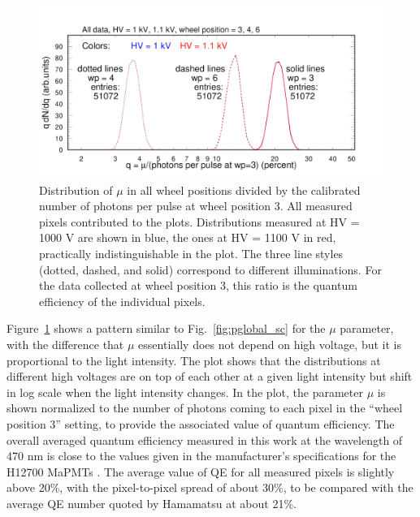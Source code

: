 \begin{figure}[h!]
	\centering
	\includegraphics[width=0.98\linewidth,trim=0 12 50 35,clip]{figures/pglobal_qe_all.pdf}
	\caption{Distribution of $\mu$ in all wheel positions divided by the calibrated number of photons per pulse at wheel position 3. All measured pixels contributed to the plots. Distributions measured at HV = 1000 V are shown in blue, the ones at HV = 1100 V in red, practically indistinguishable in the plot. The three line styles (dotted, dashed, and solid) correspond to different illuminations. For the data collected at wheel position 3, this ratio is the quantum efficiency of the individual pixels.}
	\label{fig:pglobal_qe_all}
\end{figure}
Figure~\ref{fig:pglobal_qe_all} shows a pattern similar to Fig.~\ref{fig:pglobal_sc} for the $\mu$ parameter, with the difference that $\mu$ essentially does not depend on high voltage, but it is proportional to the light intensity. The plot shows that the distributions at different high voltages are on top of each other at a given light intensity but shift in log scale when the light intensity changes. In the plot, the parameter $\mu$ is shown normalized to the number of photons coming to each pixel in the ``wheel position 3'' setting, to provide the associated value of quantum efficiency. The overall averaged quantum efficiency measured in this work at the wavelength of 470 nm is close to the values given in the manufacturer's specifications for the H12700 MaPMTs \cite{H12700}. The average value of QE for all measured pixels is slightly above 20\%, with the pixel-to-pixel spread of about 30\%, to be compared with the average QE number quoted by Hamamatsu at about 21\%. 

